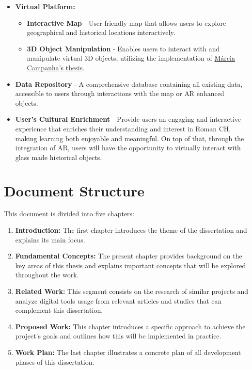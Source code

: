 \begin{itemize}
   \item \textbf{Virtual Platform:}
   \begin{itemize}
      \item \textbf{Interactive Map} - User-friendly map that allows users to explore geographical and historical locations interactively.
      \item \textbf{3D Object Manipulation} - Enables users to interact with and manipulate virtual 3D objects, utilizing the implementation of \hyperref[sec:marcia_thesis]{Márcia Campanha's thesis}.
   \end{itemize}
   \item \textbf{Data Repository} - A comprehensive database containing all existing data, accessible to users through interactions with the map or \gls{AR} enhanced objects.
   \item \textbf{User's Cultural Enrichment} - Provide users an engaging and interactive experience that enriches their understanding and interest
   in Roman \gls{CH}, making learning both enjoyable and meaningful.
   On top of that, through the integration of \gls{AR}, users will have the opportunity to virtually interact with glass made historical objects.
\end{itemize}


\section{Document Structure}
\label{sec:document_structure}


This document is divided into five chapters:


\begin{enumerate}
  \item \textbf{Introduction:} The first chapter introduces the theme of the dissertation and explains its main focus.
  
  \item \textbf{Fundamental Concepts:} The present chapter provides background on the key areas of this thesis and explains important concepts that will be explored throughout the work.
  
  \item \textbf{Related Work:} This segment consists on the research of similar projects and analyze digital tools usage from relevant articles and studies that can complement this dissertation.

  \item \textbf{Proposed Work:} This chapter introduces a specific approach to achieve the project's goals and outlines how this will be implemented in practice.
  
  \item \textbf{Work Plan:} The last chapter illustrates a concrete plan of all development phases of this dissertation.
\end{enumerate}

